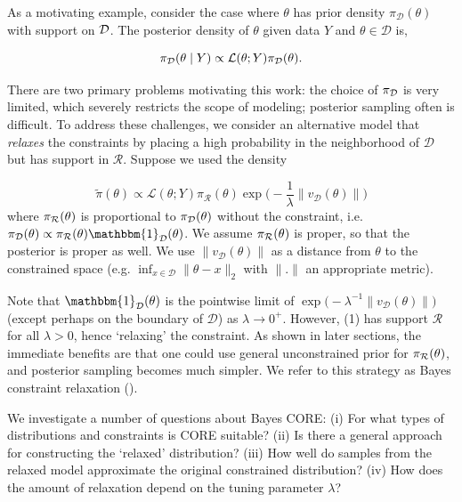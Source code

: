 \documentclass[10pt,fleqn]{article} \pdfoutput=1
\DeclareMathOperator{\1}{\mathbbm{1}} \DeclareMathOperator{\bigO}{\mc O}
\begin{document}
As a motivating example, consider the case where $\theta$ has prior density
$\pi_\mathcal{D}(\theta)$ with support on $\mathcal{D}$. The posterior density of $\theta$
given data $Y$ and $\theta \in \mathcal{D}$ is,

\begin{equation*}
	\pi_{\mathcal{D}}(\theta \mid  Y) \propto \mathcal{L}(\theta; Y)
	\pi_\mathcal{D}(\theta) .
\end{equation*}

There are two primary problems motivating this work: the choice of
$\pi_{\mathcal{D}}$ is very limited, which severely restricts the scope of modeling; posterior sampling often is difficult. To address these challenges, we consider an
alternative model that {\em relaxes} the constraints by placing a high
probability in the neighborhood of $\mathcal{D}$ but has support in $\mathcal{R}$. Suppose we used the density

\begin{equation}
	\label{EQ:Rel_Dens_Motivation}
	\tilde{\pi}(\theta) \propto
	\mathcal{L}(\theta; Y)  \pi_\mathcal{R}(\theta)
	\exp\bigg(-\frac{1}{\lambda} \|v_\mathcal{D}(\theta)\|\bigg)
\end{equation}
where  $\pi_{\mathcal{R}}(\theta)$ is proportional to $\pi_{\mathcal{D}}(\theta)$
without the constraint, i.e. $\pi_\mathcal{D}(\theta) \propto
\pi_\mathcal{R}(\theta) \mathbbm{1}_{\mc D}(\theta)$. We assume
$\pi_{\mathcal{R}}(\theta)$ is proper, so that the posterior is proper as well. We use 
$\|v_\mathcal{D}(\theta)\|$ as a distance from $\theta$ to the constrained
space (e.g. $\inf_{x\in\mathcal{D}}
	\|\theta-x\|_2$ with $\|.\|$ an appropriate metric).

Note that $\mathbbm{1}_\mathcal{D}(\theta)$ is the pointwise limit of
$\exp\big(- \lambda^{-1}\|v_\mathcal{D}(\theta)\|)$ (except perhaps on the
boundary of $\mathcal{D}$) as $\lambda \to 0^+.$ However, (1) has
support $\mathcal{R}$ for all $\lambda > 0$, hence `relaxing' the
constraint. As shown in later sections, the immediate benefits are that one could use general
unconstrained prior for $\pi_{\mathcal{R}}(\theta)$, and posterior sampling becomes much simpler.
We refer to this strategy as Bayes constraint relaxation (\core).

We investigate a number of questions about Bayes CORE:  (i) For
what types of distributions and constraints is CORE suitable? (ii) Is there
a general approach for constructing the `relaxed' distribution? (iii) How
well do samples from the relaxed model approximate the
original constrained distribution?  (iv) How does the amount of relaxation depend on the tuning parameter $\lambda$?
\end{document}
